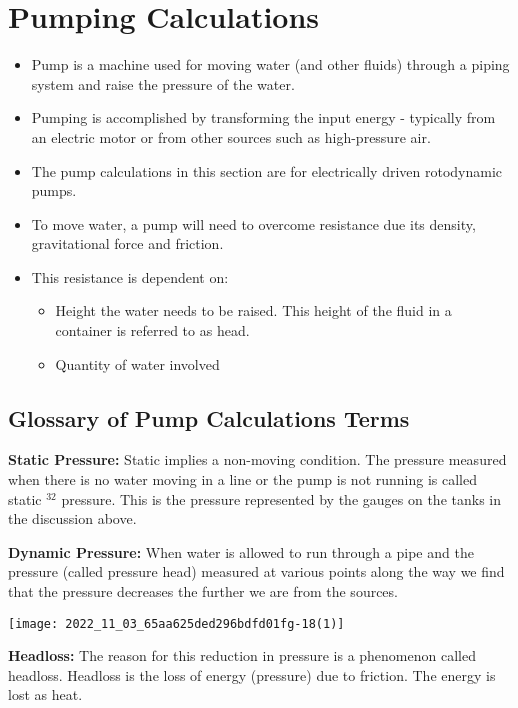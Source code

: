 \section{Pumping Calculations}
\begin{itemize}
\item Pump is a machine used for moving water (and other fluids) through a piping system and raise the pressure of the water.
\item Pumping is accomplished by transforming the input energy - typically from an electric motor or from other sources such as high-pressure air.
\item The pump calculations in this section are for electrically driven rotodynamic pumps.
\item To move water, a pump will need to overcome resistance due its density, gravitational force and friction.
\item This resistance is dependent on:
\begin{itemize}
\item Height the water needs to be raised.  This height of the fluid in a container is referred to as head. 
\item Quantity of water involved
\end{itemize}
\end{itemize}

\subsection{Glossary of Pump Calculations Terms}

\textbf{Static Pressure: } Static implies a non-moving condition.  The pressure measured when there is no water moving in a line or the pump is not running is called static $^{32}$ pressure. This is the pressure represented by the gauges on the tanks in the discussion above.

\textbf{Dynamic Pressure: } When water is allowed to run through a pipe and the pressure (called pressure head) measured at various points along the way we find that the pressure decreases the further we are from the sources.
\begin{center}
\texttt{[image: 2022\_11\_03\_65aa625ded296bdfd01fg-18(1)]}
\end{center}
\textbf{Headloss: }  The reason for this reduction in pressure is a phenomenon called headloss. Headloss is the loss of energy (pressure) due to friction. The energy is lost as heat.

